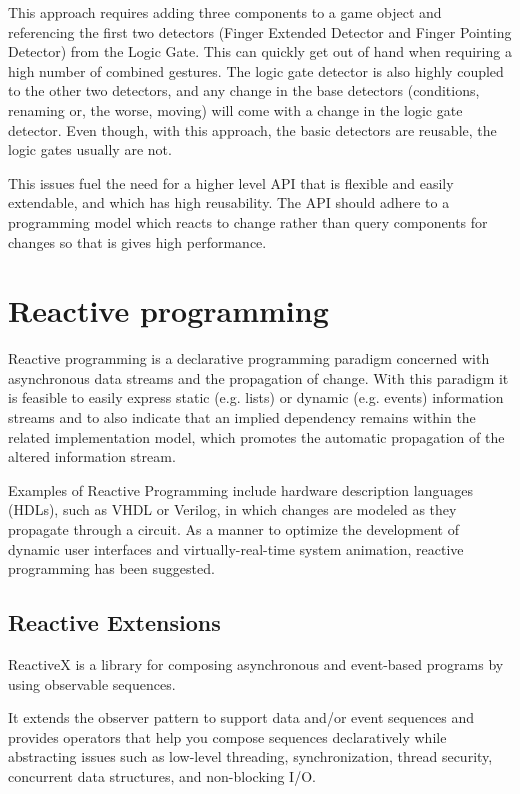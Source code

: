 \documentclass[12pt,a4paper,twoside]{report}
\begin{document}
This approach requires adding three components to a game object and referencing the first two detectors (Finger Extended Detector and Finger Pointing Detector) from the Logic Gate. This can quickly get out of hand when requiring a high number of combined gestures. The logic gate detector is also highly coupled to the other two detectors, and any change in the base detectors (conditions, renaming or, the worse, moving) will come with a change in the logic gate detector. Even though, with this approach, the basic detectors are reusable, the logic gates usually are not.

This issues fuel the need for a higher level API that is flexible and easily extendable, and which has high reusability. The API should adhere to a programming model which reacts to change rather than query components for changes so that is gives high performance.

\section{Reactive programming}
Reactive programming is a declarative programming paradigm concerned with asynchronous data streams and the propagation of change. With this paradigm it is feasible to easily express static (e.g. lists) or dynamic (e.g. events) information streams and to also indicate that an implied dependency remains within the related implementation model, which promotes the automatic propagation of the altered information stream.

Examples of Reactive Programming include hardware description languages (HDLs), such as VHDL or Verilog, in which changes are modeled as they propagate through a circuit. As a manner to optimize the development of dynamic user interfaces and virtually-real-time system animation, reactive programming has been suggested.

\subsection{Reactive Extensions}

ReactiveX is a library for composing asynchronous and event-based programs by using observable sequences. \cite{RX_intro}

It extends the observer pattern to support data and/or event sequences and provides operators that help you compose sequences declaratively while abstracting issues such as low-level threading, synchronization, thread security, concurrent data structures, and non-blocking I/O.
\end{document}
